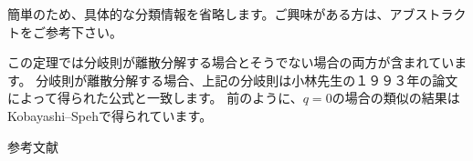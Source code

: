\documentclass[notheorems]{beamer}
\theoremstyle{definition}
\theoremstyle{example}
\theoremstyle{remark}
\theoremstyle{mystyle}
\begin{document}
\begin{frame}
{	簡単のため、具体的な分類情報を省略します。ご興味がある方は、アブストラクトをご参考下さい。

	 この定理では分岐則が離散分解する場合とそうでない場合の両方が含まれています。
		分岐則が離散分解する場合、上記の分岐則は小林先生の１９９３年の論文によって得られた公式と一致します。
	 前のように、$q=0$の場合の類似の結果はKobayashi--Spehで得られています。
}
\end{frame}

\begin{frame}[allowframebreaks]{参考文献}
	
\end{frame}
\end{document}
